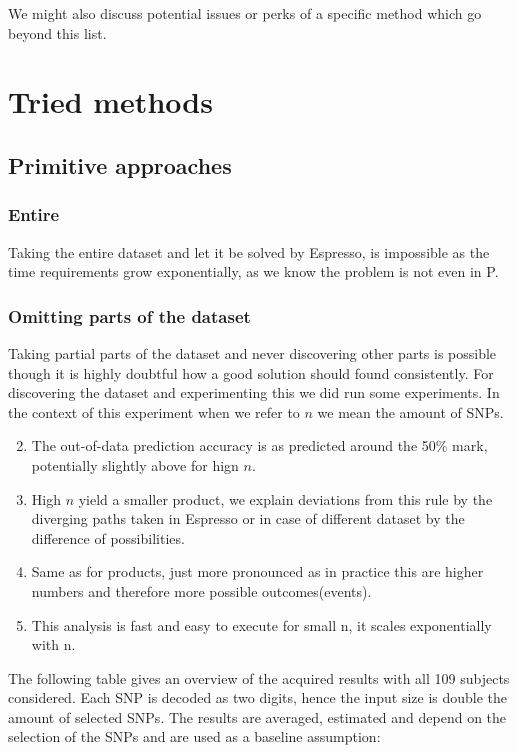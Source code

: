 \documentclass[letterpaper, 11pt]{article}
\begin{document}
We might also discuss potential issues or perks of a specific method which go beyond this list. 
\section{ Tried methods}
\subsection{Primitive approaches}
\subsubsection{Entire}
Taking the entire dataset and let it be solved by Espresso, is impossible as the time requirements grow exponentially, as we know the problem is not even in P. 
\subsubsection{Omitting parts of the dataset}
Taking partial parts of the dataset and never discovering other parts is possible though it is highly doubtful how a good solution should found consistently. For discovering the dataset and experimenting this we did run some experiments. In the context of this experiment when we refer to $n$ we mean the amount of SNPs. 

\begin{enumerate} 
\setcounter{enumi}{1}
\item The out-of-data prediction accuracy is as predicted around the 50\% mark, potentially slightly above for hign $n$. 
\setcounter{enumi}{3}
\item High $n$ yield a smaller product, we explain deviations from this rule by the diverging paths taken in Espresso or in case of different dataset by the difference of possibilities. 
\item Same as for products, just more pronounced as in practice this are higher numbers and therefore more possible outcomes(events). 
\item This analysis is fast and easy to execute for small n, it scales exponentially with n. 
\end{enumerate}


The following table gives an overview of the acquired results with all 109 subjects considered. Each SNP is decoded as two digits, hence the input size is double the amount of selected SNPs. The results are averaged, estimated and depend on the selection of the SNPs and are used as a baseline assumption:
\end{document}
